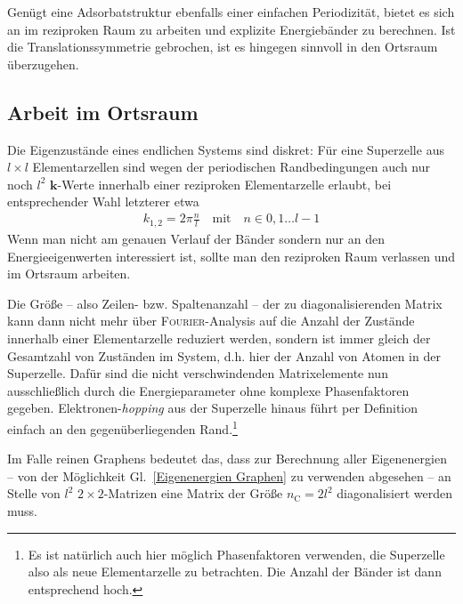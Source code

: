 \documentclass[a4paper, 10pt, twoside, openany]{book} %
\def \vec {\boldsymbol}
\def \nC {n_\mathrm{C}}
\begin{document}
	Genügt eine Adsorbatstruktur ebenfalls einer einfachen Periodizität, bietet es sich an im reziproken Raum zu arbeiten und explizite Energiebänder zu berechnen. Ist die Translationssymmetrie gebrochen, ist es hingegen sinnvoll in den Ortsraum überzugehen.
	
	\subsection{Arbeit im Ortsraum}
	
	Die Eigenzustände eines endlichen Systems sind diskret: Für eine Superzelle aus $l \times l$ Elementarzellen sind wegen der periodischen Randbedingungen auch nur noch $l^2$ $\vec k$-Werte innerhalb einer reziproken Elementarzelle erlaubt, bei entsprechender Wahl letzterer etwa
	\begin{align*}
		k_{1, 2} = 2 \pi \frac n l \quad \text{mit} \quad n \in { 0, 1 \dots l - 1 }
	\end{align*}
	Wenn man nicht am genauen Verlauf der Bänder sondern nur an den Energieeigenwerten interessiert ist, sollte man den reziproken Raum verlassen und im Ortsraum arbeiten.
	
	Die Größe -- also Zeilen- bzw. Spaltenanzahl -- der zu diagonalisierenden Matrix kann dann nicht mehr über \textsc{Fourier}-Analysis auf die Anzahl der Zustände innerhalb einer Elementarzelle reduziert werden, sondern ist immer gleich der Gesamtzahl von Zuständen im System, d.h. hier der Anzahl von Atomen in der Superzelle. Dafür sind die nicht verschwindenden Matrixelemente nun ausschließlich durch die Energieparameter ohne komplexe Phasenfaktoren gegeben. Elektronen-\emph{hopping} aus der Superzelle hinaus führt per Definition einfach an den gegenüberliegenden Rand.\footnote{Es ist natürlich auch hier möglich Phasenfaktoren verwenden, die Superzelle also als neue Elementarzelle zu betrachten. Die Anzahl der Bänder ist dann entsprechend hoch.}
	
	Im Falle reinen Graphens bedeutet das, dass zur Berechnung aller Eigenenergien -- von der Möglichkeit Gl.~\ref{Eigenenergien Graphen} zu verwenden abgesehen -- an Stelle von $l^2$ $2 \times 2$-Matrizen eine Matrix der Größe $\nC = 2 l^2$ diagonalisiert werden muss.
	
\end{document}
